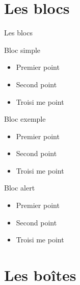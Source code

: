 \documentclass{article}
\begin{document}
\section{Les blocs}

\begin{frame}{Les blocs}

\begin{block}{Bloc simple}
\begin{itemize}
\item Premier point
\item Second point
\item Troisi me point
\end{itemize}
\end{block}

\begin{exampleblock}{Bloc exemple}
\begin{itemize}
\item Premier point
\item Second point
\item Troisi me point
\end{itemize}
\end{exampleblock}

\begin{alertblock}{Bloc alert}
\begin{itemize}
\item Premier point
\item Second point
\item Troisi me point
\end{itemize}
\end{alertblock}
\end{frame}


\section{Les bo\^ites}
\end{document}
